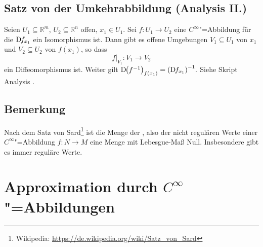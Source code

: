 \subsection{Satz von der Umkehrabbildung (Analysis II.)} %
\label{sub:1610}
Seien $U_1 \subseteq \mathds{R}^m$, $U_2 \subseteq \mathds{R}^n$ offen, $x_1 \in U_1$. Sei $f : U_1 \to U_2$ eine $C^\infty$"=Abbildung für die $\mathrm{D}\mkern-1.5mu f_{x_1}$ ein 
Isomorphismus ist. Dann gibt es offene Umgebungen $V_1 \subseteq U_1$ von $x_1$ und $V_2 \subseteq U_2$ von $f(x_1)$, so dass
\[
	f \big|_{V_1} : V_1 \to V_2
\]
ein Diffeomorphismus ist. {\color{light_gray} Weiter gilt
\(
	\D \enbrace*{f ^{-1}}_{f(x_1)} = \enbrace*{\D f_{x_1}}^{-1}.
\)}
Siehe Skript Analysis . \bewende

\subsection[Bemerkung: Aussage des Satzes von Sard]{Bemerkung} %
\label{sub:1611}
Nach dem Satz von Sard\footnote{Wikipedia: \url{https://de.wikipedia.org/wiki/Satz_von_Sard}} ist die Menge der , also der 
nicht regulären Werte einer $C^\infty$"=Abbildung $f : N \to M$ eine Menge mit Lebesgue-Maß Null. Insbesondere gibt es immer reguläre Werte.
\newpage

\section{Approximation durch $C^\infty$"=Abbildungen} %
\label{sec:17}

